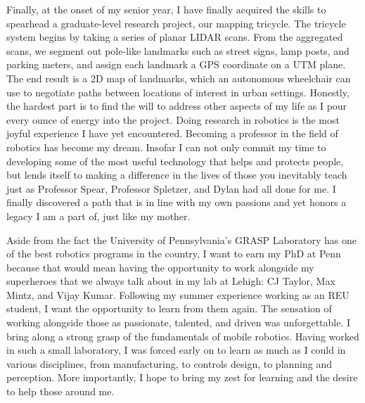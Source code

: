 \documentclass{article}
\begin{document}
Finally, at the onset of my senior year, I have finally acquired the skills to
spearhead a graduate-level research project, our mapping tricycle. The tricycle
system begins by taking a series of planar LIDAR scans. From the aggregated
scans, we segment out pole-like landmarks such as street signs, lamp posts, and
parking meters, and assign each landmark a GPS coordinate on a UTM plane.  The
end result is a 2D map of landmarks, which an autonomous wheelchair can use to
negotiate paths between locations of interest in urban settings. Honestly, the
hardest part is to find the will to address other aspects of my life as I pour
every ounce of energy into the project. Doing research in robotics is the most
joyful experience I have yet encountered. Becoming a professor in the field of
robotics has become my dream. Insofar I can not only commit my time to
developing some of the most useful technology that helps and protects people,
but lends itself to making a difference in the lives of those you inevitably
teach just as Professor Spear, Professor Spletzer, and Dylan had all done for
me. I finally discovered a path that is in line with my own passions and yet
honors a legacy I am a part of, just like my mother.

Aside from the fact the University of Pennsylvania’s GRASP Laboratory has one
of the best robotics programs in the country, I want to earn my PhD at Penn
because that would mean having the opportunity to work alongside my superheroes
that we always talk about in my lab at Lehigh: CJ Taylor, Max Mintz, and Vijay
Kumar. Following my summer experience working as an REU student, I want the
opportunity to learn from them again. The sensation of working alongside those
as passionate, talented, and driven was unforgettable.  I bring along a strong
grasp of the fundamentals of mobile robotics. Having worked in such a small
laboratory, I was forced early on to learn as much as I could in various
disciplines, from manufacturing, to controls design, to planning and
perception. More importantly, I hope to bring my zest for learning and the
desire to help those around me. 
\end{document}
